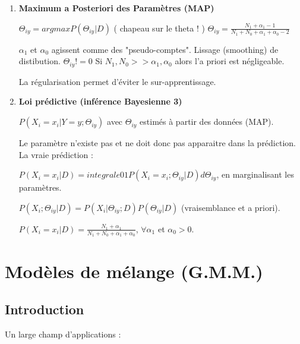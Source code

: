 \documentclass{article}
\begin{document}
\begin{enumerate}

\item \textbf{Maximum a Posteriori des Paramètres (MAP)}

$ \Theta_{iy} = argmax P(\Theta_{iy} | D) $ ( chapeau sur le theta ! )
$ \Theta_{iy} = \frac{N_1 + \alpha_1 - 1}{N_1 + N_0 + \alpha_1 + \alpha_0 - 2} $

$\alpha_1$ et $\alpha_0$ agissent comme des "pseudo-comptes". Lissage (smoothing) de distibution.
$\Theta_{iy} != 0$
Si $N_1, N_0 >> \alpha_1, \alpha_0$ alors l'a priori est négligeable.

La régularisation permet d'éviter le sur-apprentissage.

\item \textbf{Loi prédictive (inférence Bayesienne 3)}

$P(X_i = x_i | Y = y; \Theta_{iy})$ avec $\Theta_{iy}$ estimés à partir des données (MAP).

Le paramètre n'existe pas et ne doit donc pas apparaitre dans la prédiction. La vraie prédiction :

$P(X_i = x_i | D) = integrale01 P(X_i = x_i; \Theta_{iy} | D) d \Theta_{iy}$, en marginalisant les paramètres.

$P(X_i; \Theta_{iy} | D) = P(X_i | \Theta_{iy}; D) P(\Theta_{iy} | D)$ (vraisemblance et a priori).

$ P(X_i = x_i | D) = \frac{N_1 + \alpha_1}{N_1 + N_0 + \alpha_1 + \alpha_0}$, $\forall \alpha_1$ et $\alpha_0 > 0$.

\end{enumerate}

\section{Modèles de mélange (G.M.M.)}

\subsection{Introduction}

Un large champ d'applications :
\end{document}
